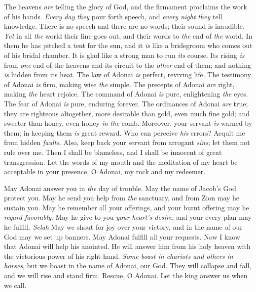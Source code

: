 \begin{biblechapter} %
 The heavens \textit{are} telling the glory of God, 
and the firmament proclaims the work of his hands.
\verse \textit{Every day} \textit{they} pour forth speech, 
and \textit{every night} \textit{they} tell knowledge.
\verse There is no speech and there are no words; 
their sound is inaudible.
\verse \textit{Yet} in all \textit{the} world their line goes out, 
and their words to \textit{the} end of \textit{the} world. 
In them he has pitched a tent for the sun,
\verse and it \textit{is} like a bridegroom 
who comes out of his bridal chamber. 
It is glad like a strong man 
to run \textit{its} course.
\verse Its rising \textit{is} from \textit{one} end of the heavens 
and its circuit to the \textit{other} end of them; 
and nothing \textit{is} hidden from its heat.
\verse The law of Adonai \textit{is} perfect, reviving life. 
The testimony of Adonai \textit{is} firm, making wise \textit{the} simple.
\verse The precepts of Adonai \textit{are} right, making \textit{the} heart rejoice. 
The command of Adonai \textit{is} pure, enlightening \textit{the} eyes.
\verse The fear of Adonai \textit{is} pure, enduring forever. 
The ordinances of Adonai \textit{are} true; they are righteous altogether,
\verse more desirable than gold, even much fine gold; 
and sweeter than honey, even honey \textit{in the} comb.
\verse Moreover, your servant \textit{is} warned by them; 
in keeping them \textit{is} great reward.
\verse Who can perceive \textit{his} errors? 
Acquit me from hidden \textit{faults}.
\verse Also, keep back your servant from arrogant \textit{sins}; 
let them not rule over me. 
Then I shall be blameless, 
and I shall be innocent of great transgression.
\verse Let the words of my mouth and the meditation of my heart 
be acceptable in your presence, 
O Adonai, my rock and my redeemer.
\end{biblechapter}

\begin{biblechapter} %
 May Adonai answer you in \textit{the} day of trouble. 
May the name of Jacob’s God protect you.
\verse May he send you help from \textit{the} sanctuary, 
and from Zion may he sustain you.
\verse May he remember all your offerings, 
and your burnt offering may he \textit{regard favorably}.
\verse May he give to you \textit{your heart’s desire}, 
and your every plan may he fulfill. \textit{Selah}
\verse May we shout for joy over your victory, 
and in the name of our God may we set up banners. 
May Adonai fulfill all your requests.
\verse Now I know that Adonai will help his anointed. 
He will answer him from his holy heaven 
with the victorious power of his right hand.
\verse \textit{Some boast in chariots and others in horses}, 
but we boast in the name of Adonai, our God.
\verse They will collapse and fall, 
and we will rise and stand firm.
\verse Rescue, O Adonai. 
Let the king answer us when we call.
\end{biblechapter}

